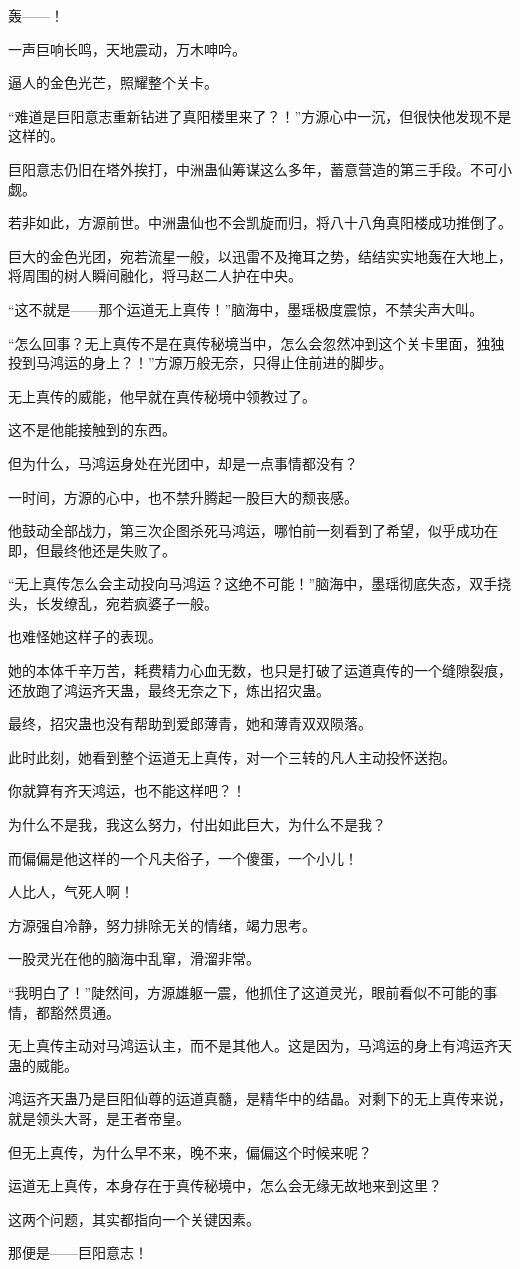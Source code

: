 \begin{this_body}
轰——！

一声巨响长鸣，天地震动，万木呻吟。

逼人的金色光芒，照耀整个关卡。

“难道是巨阳意志重新钻进了真阳楼里来了？！”方源心中一沉，但很快他发现不是这样的。

巨阳意志仍旧在塔外挨打，中洲蛊仙筹谋这么多年，蓄意营造的第三手段。不可小觑。

若非如此，方源前世。中洲蛊仙也不会凯旋而归，将八十八角真阳楼成功推倒了。

巨大的金色光团，宛若流星一般，以迅雷不及掩耳之势，结结实实地轰在大地上，将周围的树人瞬间融化，将马赵二人护在中央。

“这不就是——那个运道无上真传！”脑海中，墨瑶极度震惊，不禁尖声大叫。

“怎么回事？无上真传不是在真传秘境当中，怎么会忽然冲到这个关卡里面，独独投到马鸿运的身上？！”方源万般无奈，只得止住前进的脚步。

无上真传的威能，他早就在真传秘境中领教过了。

这不是他能接触到的东西。

但为什么，马鸿运身处在光团中，却是一点事情都没有？

一时间，方源的心中，也不禁升腾起一股巨大的颓丧感。

他鼓动全部战力，第三次企图杀死马鸿运，哪怕前一刻看到了希望，似乎成功在即，但最终他还是失败了。

“无上真传怎么会主动投向马鸿运？这绝不可能！”脑海中，墨瑶彻底失态，双手挠头，长发缭乱，宛若疯婆子一般。

也难怪她这样子的表现。

她的本体千辛万苦，耗费精力心血无数，也只是打破了运道真传的一个缝隙裂痕，还放跑了鸿运齐天蛊，最终无奈之下，炼出招灾蛊。

最终，招灾蛊也没有帮助到爱郎薄青，她和薄青双双陨落。

此时此刻，她看到整个运道无上真传，对一个三转的凡人主动投怀送抱。

你就算有齐天鸿运，也不能这样吧？！

为什么不是我，我这么努力，付出如此巨大，为什么不是我？

而偏偏是他这样的一个凡夫俗子，一个傻蛋，一个小儿！

人比人，气死人啊！

方源强自冷静，努力排除无关的情绪，竭力思考。

一股灵光在他的脑海中乱窜，滑溜非常。

“我明白了！”陡然间，方源雄躯一震，他抓住了这道灵光，眼前看似不可能的事情，都豁然贯通。

无上真传主动对马鸿运认主，而不是其他人。这是因为，马鸿运的身上有鸿运齐天蛊的威能。

鸿运齐天蛊乃是巨阳仙尊的运道真髓，是精华中的结晶。对剩下的无上真传来说，就是领头大哥，是王者帝皇。

但无上真传，为什么早不来，晚不来，偏偏这个时候来呢？

运道无上真传，本身存在于真传秘境中，怎么会无缘无故地来到这里？

这两个问题，其实都指向一个关键因素。

那便是——巨阳意志！

\end{this_body}

